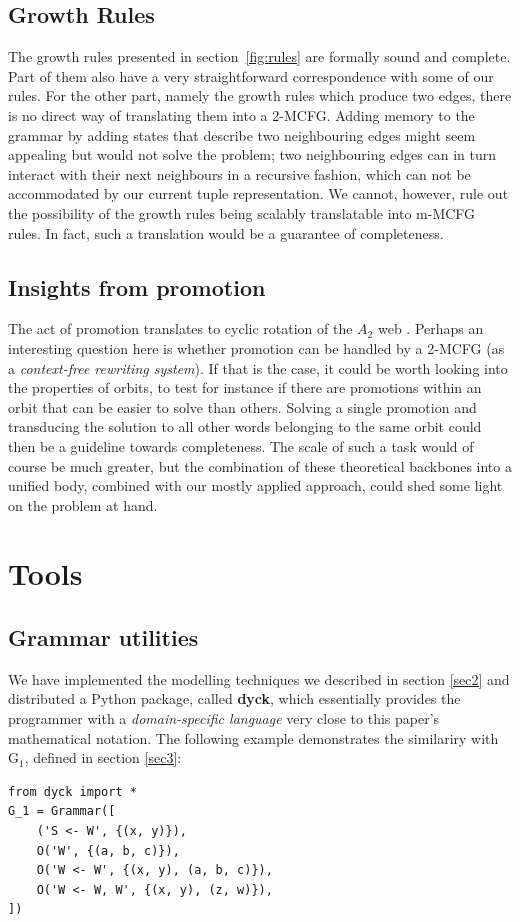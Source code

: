 \documentclass[nonatbib,numbers,10pt]{llncs}
\begin{document}
\subsection{Growth Rules}
The growth rules presented in section~\ref{fig:rules} are formally sound and complete. Part of them also have a very straightforward correspondence with some of our rules. For the other part, namely the growth rules which produce two edges, there is no direct way of translating them into a 2-MCFG. Adding memory to the grammar by adding states that describe two neighbouring edges might seem appealing but would not solve the problem; two neighbouring edges can in turn interact with their next neighbours in a recursive fashion, which can not be accommodated by our current tuple representation. We cannot, however, rule out the possibility of the growth rules being scalably translatable into m-MCFG rules. In fact, such a translation would be a guarantee of completeness.
\subsection{Insights from promotion}
The act of promotion translates to cyclic rotation of the $A_2$ web \cite{petersen}. Perhaps an interesting question here is whether promotion can be handled by a 2-MCFG (as a \textit{context-free rewriting system}). If that is the case, it could be worth looking into the properties of orbits, to test for instance if there are promotions within an orbit that can be easier to solve than others. Solving a single promotion and transducing the solution to all other words belonging to the same orbit could then be a guideline towards completeness. The scale of such a task would of course be much greater, but the combination of these theoretical backbones into a unified body, combined with our mostly applied approach, could shed some light on the problem at hand.

\section{Tools}\label{tools}
\subsection{Grammar utilities}
We have implemented the modelling techniques we described in section \ref{sec2} and distributed a Python package, called \textbf{dyck}, which essentially provides the programmer with a \textit{domain-specific language} very close to this paper's mathematical notation. The following example demonstrates the similariry with G$_1$, defined in section \ref{sec3}:
\begin{verbatim}
from dyck import *
G_1 = Grammar([
    ('S <- W', {(x, y)}),
    O('W', {(a, b, c)}),
    O('W <- W', {(x, y), (a, b, c)}),
    O('W <- W, W', {(x, y), (z, w)}),
])
\end{verbatim}
\end{document}
